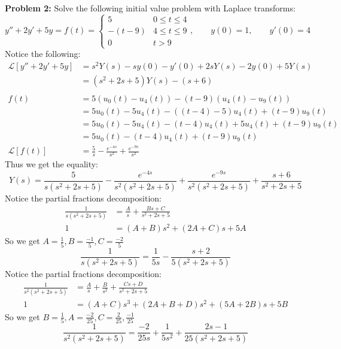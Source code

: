 \documentclass[12pt]{article}
\begin{document}
\noindent \textbf{Problem 2: }Solve the following initial value problem with Laplace transforms:
	$$
	y''  + 2y' + 5y = f(t) = 
	\begin{cases}
		5 & 0 \leq t \leq 4 \\
		-(t-9) & 4 \leq t \leq 9 \\
		0 & t > 9 
	\end{cases}, \qquad y(0) = 1, \qquad y'(0) = 4
	$$
Notice the following:
	\begin{align*}
		\mathcal{L}[y'' + 2y' + 5y] &= s^2Y(s) - sy(0) - y'(0) + 2sY(s) - 2y(0) + 5Y(s) \\
		&= (s^2 + 2s + 5)Y(s) - (s + 6) \\ \\ 
		f(t) &= 5(u_0(t) - u_4(t)) -(t-9)(u_4(t) - u_9(t)) \\
		&= 5u_0(t) - 5u_4(t) - ((t-4) - 5)u_4(t) + (t-9)u_9(t) \\
		&= 5u_0(t) - 5u_4(t) - (t-4)u_4(t) + 5u_4(t) + (t-9)u_9(t) \\
		&= 5u_0(t) - (t-4)u_4(t) + (t-9)u_9(t) \\
		\mathcal{L}[f(t)] &= \frac{5}{s} - \frac{e^{-4s}}{s^2} + \frac{e^{-9s}}{s^2}
	\end{align*}
Thus we get the equality:
	$$
	Y(s) = \frac{5}{s(s^2 + 2s + 5)} - \frac{e^{-4s}}{s^2(s^2 + 2s + 5)} + \frac{e^{-9s}}{s^2(s^2 + 2s + 5)} + \frac{s+6}{s^2 + 2s + 5}
	$$
Notice the partial fractions decomposition:
	\begin{align*}
		\frac{1}{s(s^2 + 2s + 5)} &= \frac{A}{s} + \frac{Bs + C}{s^2 + 2s + 5} \\
		1 &= (A+B)s^2 + (2A+C)s + 5A 
	\end{align*}
So we get $A = \frac{1}{5}, B = \frac{-1}{5}, C = \frac{-2}{5}$
	$$
	\frac{1}{s(s^2 + 2s + 5)} = \frac{1}{5s} - \frac{s + 2}{5(s^2 + 2s + 5)}
	$$
Notice the partial fractions decomposition:
	\begin{align*}
		\frac{1}{s^2(s^2 + 2s + 5)} &= \frac{A}{s} +  \frac{B}{s^2} + \frac{Cs + D}{s^2 + 2s + 5} \\
		1 &= (A+C)s^3 + (2A + B + D)s^2 + (5A + 2B)s + 5B
	\end{align*}
So we get $B = \frac{1}{5}, A = \frac{-2}{25}, C = \frac{2}{25}, \frac{-1}{25}$
	$$
	\frac{1}{s^2(s^2 + 2s + 5)} = \frac{-2}{25s} +  \frac{1}{5s^2} + \frac{2s - 1}{25(s^2 + 2s + 5)}
	$$
\newpage 
\end{document}
